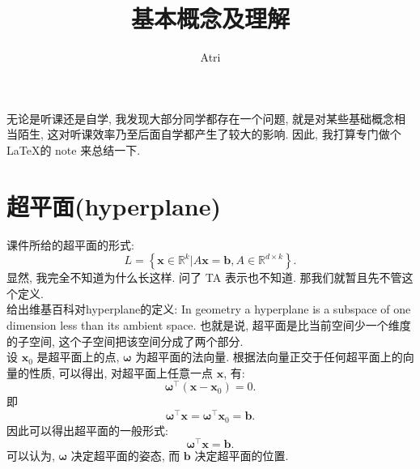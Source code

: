 \documentclass[lang = cn]{elegantpaper}
\title{基本概念及理解}
\author{Atri}
\begin{document}
\maketitle
无论是听课还是自学, 我发现大部分同学都存在一个问题, 就是对某些基础概念相当陌生, 这对听课效率乃至后面自学都产生了较大的影响. 因此, 我打算专门做个 \LaTeX 的 note 来总结一下.
\section{超平面(hyperplane)}
\noindent
课件所给的超平面的形式:
\begin{equation*}
    L = \left\{\bm{x}\in\mathbb{R}^k|A\bm{x}=\bm{b},A\in\mathbb{R}^{d \times k}\right\}.
\end{equation*}
显然, 我完全不知道为什么长这样. 问了 TA 表示也不知道. 那我们就暂且先不管这个定义.\\
给出维基百科对hyperplane的定义: In geometry a hyperplane is a subspace of one dimension less than its ambient space. 也就是说, 超平面是比当前空间少一个维度的子空间, 这个子空间把该空间分成了两个部分.\\
设 $\bm{x}_0$ 是超平面上的点, $\bm{\omega}$ 为超平面的法向量. 根据法向量正交于任何超平面上的向量的性质, 可以得出, 对超平面上任意一点 $\bm{x}$, 有:
\begin{equation*}
    \bm{\omega}^\top(\bm{x}-\bm{x}_0) = 0.
\end{equation*}
即
\begin{equation*}
    \bm{\omega}^\top \bm{x} = \bm{\omega}^\top \bm{x}_0 = \bm{b}.
\end{equation*}
因此可以得出超平面的一般形式:
\begin{equation*}
    \bm{\omega}^\top \bm{x} = \bm{b}.
\end{equation*}
可以认为, $\bm{\omega}$ 决定超平面的姿态, 而 $\bm{b}$ 决定超平面的位置.
\end{document}
